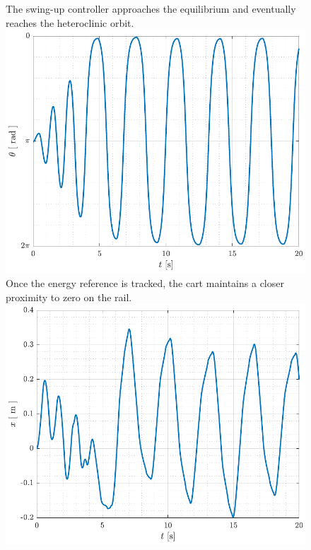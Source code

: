 %
%
\begin{figure}[H]
  \hspace{1cm}
  \captionbox
  {
    The swing-up controller approaches the equilibrium and eventually reaches the heteroclinic orbit.
    \label{fig:theta_swing_p08}
  }
  {
    \hspace{-1cm}
    \includegraphics[width=.395\textwidth]{figures/theta_swing_p08}
  }
  \hspace{20pt}
  \captionbox 
  {
    Once the energy reference is tracked, the cart maintains a closer proximity to zero on the rail.
    \label{fig:x_swing_p08}
  }
  {
    \hspace{-1cm}
    \includegraphics[width=.4\textwidth]{figures/x_swing_p08}
  }  
\end{figure}

